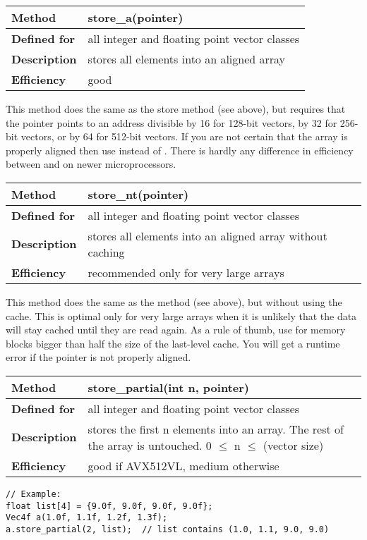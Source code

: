 \documentclass[vcl_manual.tex]{subfiles}
\begin{document}
\begin{tabular}{|p{25mm}|p{100mm}|}
\hline
\bfseries Method & store\_a(pointer) \\ \hline
\bfseries Defined for & all integer and floating point vector classes \\ \hline
\bfseries Description & stores all elements into an aligned array \\ \hline
\bfseries Efficiency & good \\ \hline
\end{tabular}

This method does the same as the store method (see above), but requires that the pointer points to an address divisible by 16 for 128-bit vectors, by 32 for 256-bit vectors, or by 64 for 512-bit vectors. If you are not certain that the array is properly aligned then use  instead of .
There is hardly any difference in efficiency between  and  on newer microprocessors.

\begin{tabular}{|p{25mm}|p{100mm}|}
\hline
\bfseries Method & store\_nt(pointer) \\ \hline
\bfseries Defined for & all integer and floating point vector classes \\ \hline
\bfseries Description & stores all elements into an aligned array without caching \\ \hline
\bfseries Efficiency & recommended only for very large arrays \\ \hline
\end{tabular}

This method does the same as the  method (see above), but without using the cache. This is optimal only for very large arrays when it is unlikely that the data will stay cached until they are read again.
As a rule of thumb, use  for memory blocks bigger than half the size of the last-level cache. You will get a runtime error if the pointer is not properly aligned.

\begin{tabular}{|p{25mm}|p{100mm}|}
\hline
\bfseries Method & store\_partial(int n, pointer) \\ \hline
\bfseries Defined for & all integer and floating point vector classes \\ \hline
\bfseries Description & stores the first n elements into an array. The rest of the array is untouched. 
0 $\leq$ n $\leq$ (vector size) \\ \hline
\bfseries Efficiency & good if AVX512VL, medium otherwise \\ \hline
\end{tabular}
\begin{lstlisting}[frame=none]
// Example:
float list[4] = {9.0f, 9.0f, 9.0f, 9.0f};
Vec4f a(1.0f, 1.1f, 1.2f, 1.3f);
a.store_partial(2, list);  // list contains (1.0, 1.1, 9.0, 9.0)
\end{lstlisting}
\end{document}
